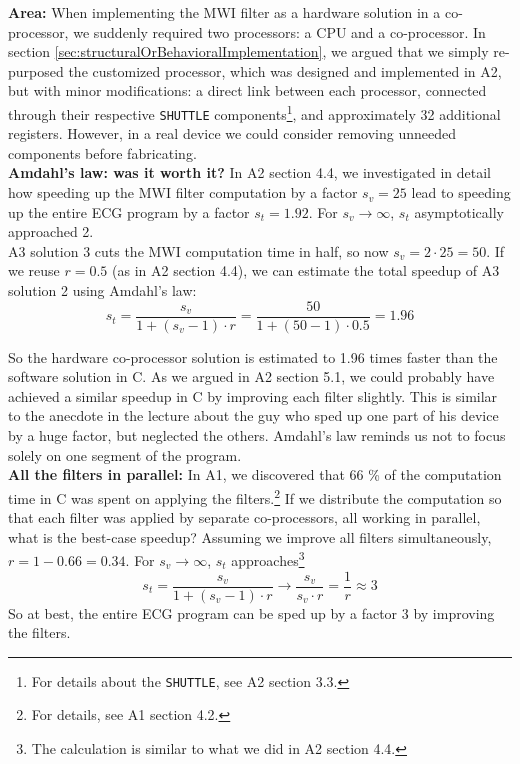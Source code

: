 \textbf{Area:} When implementing the MWI filter as a hardware solution in a co-processor, we suddenly required two processors: a CPU and a co-processor. In section \ref{sec:structuralOrBehavioralImplementation}, we argued that we simply re-purposed the customized processor, which was designed and implemented in A2, but with minor modifications: a direct link between each processor, connected through their respective \texttt{SHUTTLE} components\footnote{For details about the \texttt{SHUTTLE}, see A2 section 3.3.}, and  approximately 32 additional registers.
However, in a real device we could consider removing unneeded components before fabricating.\\

\textbf{Amdahl's law: was it worth it?} In A2 section 4.4, we investigated in detail how speeding up the MWI filter computation by a factor $s_v = 25$  lead to speeding up the entire ECG program by a factor $s_t = 1.92$. For $s_v \rightarrow \infty$, $s_t$ asymptotically approached 2. \\

A3 solution 3 cuts the MWI computation time in half, so now $s_v = 2\cdot 25 = 50$. If we reuse $r=0.5$ (as in A2 section 4.4), we can estimate the total speedup of A3 solution 2 using Amdahl's law:
\begin{equation}
    s_t = \frac{s_v}{1+(s_v-1) \cdot r} = \frac{50}{1+(50-1) \cdot 0.5} = 1.96
\end{equation}

So the hardware co-processor solution is estimated to 1.96 times faster than the software solution in C. As we argued in A2 section 5.1, we could probably have achieved a similar speedup in C by improving each filter slightly. This is similar to the anecdote in the lecture about the guy who sped up one part of his device by a huge factor, but neglected the others. Amdahl's law reminds us not to focus solely on one segment of the program.\\

\textbf{All the filters in parallel:}
In A1, we discovered that 66 \% of the computation time in C was spent on applying the filters.\footnote{For details, see A1 section 4.2.} If we distribute the computation so that each filter was applied by separate co-processors, all working in parallel, what is the best-case speedup? Assuming we improve all filters simultaneously, $r= 1 - 0.66 = 0.34$. For $s_v \rightarrow \infty$, $s_t$ approaches\footnote{The calculation is similar to what we did in A2 section 4.4.}
\begin{equation}
    s_t = \frac{s_v}{1+(s_v-1) \cdot r} \rightarrow \frac{s_v}{s_v \cdot r} = \frac{1}{r} \approx 3
\end{equation}
So at best, the entire ECG program can be sped up by a factor 3 by improving the filters.

